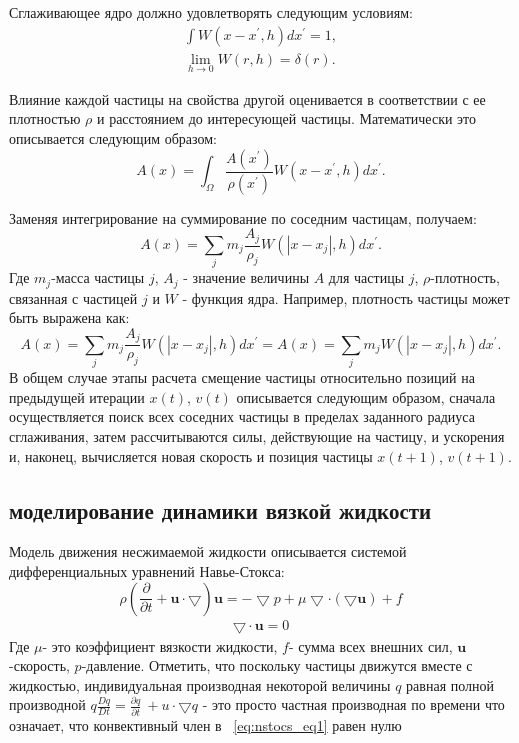 Сглаживающее ядро должно удовлетворять следующим условиям:
\begin{align}
  \int W(x-x^{'},h)dx^{'}=1, \nonumber \\
  \lim_{h\rightarrow0}W(r, h) = \delta (r). \nonumber
\end{align}

Влияние каждой частицы на свойства другой оценивается в соответствии с ее плотностью \(\rho\) и расстоянием до интересующей частицы. Математически это описывается следующим образом:
\[
  A(x)=\int_{\Omega}\frac{A(x^{'})}{\rho(x^{'})}W(x-x^{'},h)dx^{'}.
\]

Заменяя интегрирование  на суммирование по соседним частицам, получаем:
\[
  A(x)=\sum_{j}m_j\frac{A_j}{\rho_j}W(\left | x-x_{j} \right |,h)dx^{'}.
\]
Где \(m_j\)-масса частицы \(j\), \(A_j\) - значение величины \(A\) для частицы \(j\), \(\rho\)-плотность, связанная с частицей \(j\) и \(W\) - функция ядра. Например, плотность частицы может быть выражена как:
\[
  A(x)=\sum_{j}m_j\frac{A_j}{\rho_j}W(\left | x-x_{j} \right |,h)dx^{'}=A(x)=\sum_{j}m_jW(\left | x-x_{j} \right |,h)dx^{'}.
\]
В общем случае этапы расчета смещение частицы относительно позиций на предыдущей итерации \(x(t)\), \(v(t)\) описывается следующим образом, сначала осуществляется поиск всех соседних частицы в пределах заданного радиуса сглаживания, затем рассчитываются силы, действующие на частицу, и ускорения и, наконец, вычисляется новая скорость и позиция частицы \(x(t+1)\), \(v(t+1)\).

\subsection{моделирование динамики вязкой жидкости}\label{subsec:ch1/sec4/sub1}

Модель движения несжимаемой жидкости описывается системой дифференциальных уравнений Навье-Стокса:
\begin{equation}
  \label{eq:nstocs_eq1}
  \rho \left ( \frac{\partial }{\partial t} + \mathbf{u} \cdot \bigtriangledown \right )\mathbf{u}=-\bigtriangledown p + \mu \bigtriangledown \cdot (\bigtriangledown \mathbf{u})+f
\end{equation}
\begin{align}
  \bigtriangledown \cdot \mathbf{u} = 0 \nonumber
\end{align}
Где \(\mu\)- это коэффициент вязкости жидкости, \(f\)- сумма всех внешних сил, \(\mathbf{u}\)-скорость, \(p\)-давление. Отметить, что поскольку частицы движутся вместе с жидкостью, индивидуальная производная некоторой величины \(q\) равная полной производной \(q\frac{Dq}{Dt}=\frac{\partial q}{\partial t}\ + u \cdot \bigtriangledown q\) - это просто частная производная по времени что означает, что конвективный член в ~\ref{eq:nstocs_eq1} равен нулю \cite {Müller2003, Sedov1970}

